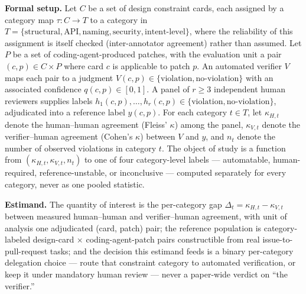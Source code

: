 \documentclass[11pt]{article}
\begin{document}
\noindent\textbf{Formal setup.} Let $C$ be a set of design constraint cards, each assigned by a category map $\tau: C \to T$ to a category in $T = \{\text{structural}, \text{API}, \text{naming}, \text{security}, \text{intent-level}\}$, where the reliability of this assignment is itself checked (inter-annotator agreement) rather than assumed. Let $P$ be a set of coding-agent-produced patches, with the evaluation unit a pair $(c,p) \in C \times P$ where card $c$ is applicable to patch $p$. An automated verifier $V$ maps each pair to a judgment $V(c,p) \in \{\text{violation}, \text{no-violation}\}$ with an associated confidence $q(c,p) \in [0,1]$. A panel of $r \geq 3$ independent human reviewers supplies labels $h_1(c,p),\dots,h_r(c,p) \in \{\text{violation}, \text{no-violation}\}$, adjudicated into a reference label $y(c,p)$. For each category $t \in T$, let $\kappa_{H,t}$ denote the human--human agreement (Fleiss' $\kappa$) among the panel, $\kappa_{V,t}$ denote the verifier--human agreement (Cohen's $\kappa$) between $V$ and $y$, and $n_t$ denote the number of observed violations in category $t$. The object of study is a function from $(\kappa_{H,t}, \kappa_{V,t}, n_t)$ to one of four category-level labels --- automatable, human-required, reference-unstable, or inconclusive --- computed separately for every category, never as one pooled statistic.

\medskip
\noindent\textbf{Estimand.} The quantity of interest is the per-category gap $\Delta_t = \kappa_{H,t} - \kappa_{V,t}$ between measured human--human and verifier--human agreement, with unit of analysis one adjudicated (card, patch) pair; the reference population is category-labeled design-card $\times$ coding-agent-patch pairs constructible from real issue-to-pull-request tasks; and the decision this estimand feeds is a binary per-category delegation choice --- route that constraint category to automated verification, or keep it under mandatory human review --- never a paper-wide verdict on ``the verifier.''
\end{document}
